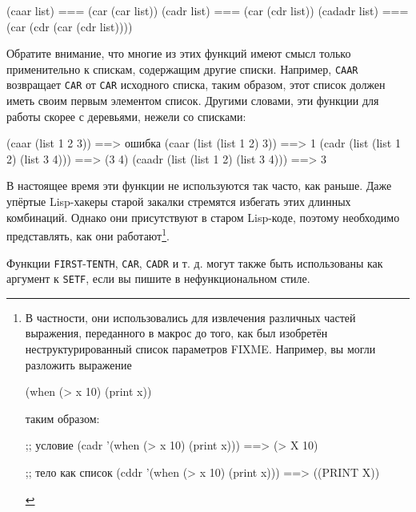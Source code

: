 \begin{myverb}
(caar list)   === (car (car list))
(cadr list)   === (car (cdr list))
(cadadr list) === (car (cdr (car (cdr list))))
\end{myverb}

Обратите внимание, что многие из этих функций имеют смысл только применительно к спискам,
содержащим другие списки. Например, \lstinline{CAAR} возвращает \lstinline{CAR} от \lstinline{CAR}
исходного списка, таким образом, этот список должен иметь своим первым элементом
список. Другими словами, эти функции для работы скорее с деревьями, нежели со списками:

\begin{myverb}
(caar (list 1 2 3))                  ==> ошибка
(caar (list (list 1 2) 3))           ==> 1
(cadr (list (list 1 2) (list 3 4)))  ==> (3 4)
(caadr (list (list 1 2) (list 3 4))) ==> 3
\end{myverb}

В настоящее время эти функции не используются так часто, как раньше. Даже упёртые
Lisp-хакеры старой закалки стремятся избегать этих длинных комбинаций. Однако они
присутствуют в старом Lisp-коде, поэтому необходимо представлять, как они
работают\footnote{В частности, они использовались для извлечения различных частей
  выражения, переданного в макрос до того, как был изобретён неструктурированный список
  параметров FIXME. Например, вы могли разложить выражение

\begin{myverb}
(when (> x 10) (print x))
\end{myverb}

таким образом:

\begin{myverb}
;; условие
(cadr '(when (> x 10) (print x))) ==> (> X 10)

;; тело как список
(cddr '(when (> x 10) (print x))) ==> ((PRINT X))
\end{myverb}
}.

Функции \lstinline{FIRST}-\lstinline{TENTH}, \lstinline{CAR}, \lstinline{CADR} и т. д. могут также быть
использованы как аргумент к \lstinline{SETF}, если вы пишите в нефункциональном стиле.

